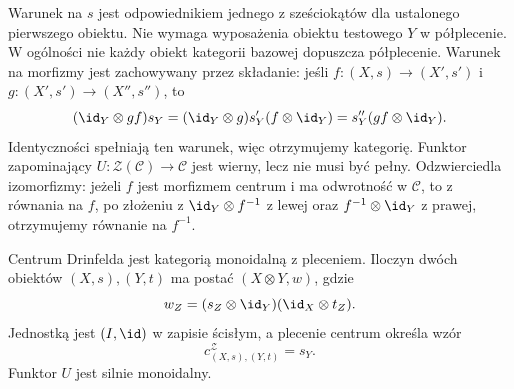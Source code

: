 Warunek na $s$ jest odpowiednikiem jednego z sześciokątów dla ustalonego pierwszego obiektu. Nie wymaga wyposażenia obiektu testowego $Y$ w półplecenie. W ogólności nie każdy obiekt kategorii bazowej dopuszcza półplecenie. Warunek na morfizmy jest zachowywany przez składanie: jeśli $f:(X,s)\to(X',s')$ i $g:(X',s')\to(X'',s'')$, to
\[
 (\id_Y\otimes gf)s_Y
 =(\id_Y\otimes g)s'_Y(f\otimes\id_Y)
 =s''_Y(gf\otimes\id_Y).
\]
Identyczności spełniają ten warunek, więc otrzymujemy kategorię. Funktor zapominający $U:\mathcal Z(\mathcal C)\to\mathcal C$ jest wierny, lecz nie musi być pełny. Odzwierciedla izomorfizmy: jeżeli $f$ jest morfizmem centrum i ma odwrotność w $\mathcal C$, to z równania na $f$, po złożeniu z $\id_Y\otimes f^{-1}$ z lewej oraz $f^{-1}\otimes\id_Y$ z prawej, otrzymujemy równanie na $f^{-1}$.

\begin{twierdzenie}\label{cat:thm:tf-center-braided}
Centrum Drinfelda jest kategorią monoidalną z pleceniem. Iloczyn dwóch obiektów $(X,s),(Y,t)$ ma postać $(X\otimes Y,w)$, gdzie
\[
 w_Z=(s_Z\otimes\id_Y)(\id_X\otimes t_Z).
\]
Jednostką jest $(I,\id)$ w zapisie ścisłym, a plecenie centrum określa wzór
\[
 c^{\mathcal Z}_{(X,s),(Y,t)}=s_Y.
\]
Funktor $U$ jest silnie monoidalny.
\end{twierdzenie}
